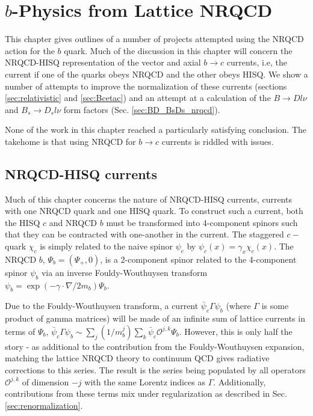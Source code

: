 ﻿\chapter{$b$-Physics from Lattice NRQCD}
\label{chap:nrqcd}

This chapter gives outlines of a number of projects attempted using the NRQCD action for the $b$ quark. Much of the discussion in this chapter will concern the NRQCD-HISQ representation of the vector and axial $b\to c$ currents, i.e, the current if one of the quarks obeys NRQCD and the other obeys HISQ. We show a number of attempts to improve the normalization of these currents (sections \ref{sec:relativistic} and \ref{sec:Bcetac}) and an attempt at a calculation of the $B\to Dl\nu$ and $B_s\to D_s l\nu$ form factors (Sec. \ref{sec:BD_BsDs_nrqcd}).

None of the work in this chapter reached a particularly satisfying conclusion. The takehome is that using NRQCD for $b \to c$ currents is riddled with issues.

\section{NRQCD-HISQ currents}

Much of this chapter concerns the nature of NRQCD-HISQ currents, currents with one NRQCD quark and one HISQ quark. To construct such a current, both the HISQ $c$ and NRQCD $b$ must be transformed into 4-component spinors such that they can be contracted with one-another in the current. The staggered $c-$quark $\chi_c$ is simply related to the naive spinor $\psi_c$ by $\psi_c(x)=\gamma_x \chi_c(x)$. The NRQCD $b$, $\Psi_{b} = ( \Psi_+, 0 )$, is a 2-component spinor related to the 4-component spinor $\psi_b$ via an inverse Fouldy-Wouthuysen transform $\psi_b = \exp( - \gamma\cdot \nabla / 2m_b )\Psi_b$.

Due to the Fouldy-Wouthuysen transform, a current $\bar{\psi}_c \Gamma \psi_b$ (where $\Gamma$ is some product of gamma matrices) will be made of an infinite sum of lattice currents in terms of $\Psi_b$, $\bar{\psi}_c \Gamma \psi_b \sim \sum_j (1/m_b^j) \sum_k \bar{\psi}_c \mathcal{O}^{j,k} \Psi_b$. However, this is only half the story - as additional to the contribution from the Fouldy-Wouthuysen expansion, matching the lattice NRQCD theory to continuum QCD gives radiative corrections to this series. The result is the series being populated by all operators $\mathcal{O}^{j,k}$ of dimension $-j$ with the same Lorentz indices as $\Gamma$. Additionally, contributions from these terms mix under regularization as described in Sec. \ref{sec:renormalization}.

